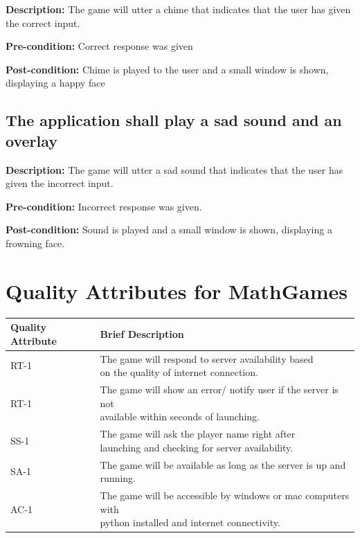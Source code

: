 \documentclass[12pt]{article}
\begin{document}
\begin{flushleft}
\textbf{Description:} The game will utter a chime that indicates that the user has given the correct input.

\textbf{Pre-condition:} Correct response was given

\textbf{Post-condition:} Chime is played to the user and a small window is shown, displaying a happy face


\subsection{The application shall play a sad sound and an overlay}

\textbf{Description:} The game will utter a sad sound that indicates that the user has given the incorrect input.

\textbf{Pre-condition:} Incorrect response was given.

\textbf{Post-condition:} Sound is played and a small window is shown, displaying a frowning face.

\end{flushleft}

\newpage

\section{Quality Attributes for MathGames}

\begin{table}[H]
\begin{tabular}{@{}|l|l|@{}}
\toprule
\textbf{Quality Attribute} & \textbf{Brief Description} \\ \midrule
RT-1 & \makecell{The game will respond to server availability based \\ on the quality of internet connection.} \\ \midrule
RT-1 & \makecell{The game will show an error/ notify user if the server is not \\ available within seconds of launching.} \\ \midrule
SS-1 & \makecell{The game will ask the player name right after \\ launching and checking for server availability.} \\ \midrule
SA-1 & The game will be available as long as the server is up and running. \\ \midrule
AC-1 & \makecell{The game will be accessible by windows or mac computers with \\ python installed and internet connectivity}. \\ \bottomrule
\end{tabular}
\end{table}
\end{document}
